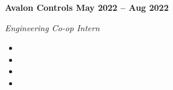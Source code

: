 \vspace{0.1cm}
\textbf{Avalon Controls \hfill May 2022 -- Aug 2022} \par
\textit{Engineering Co-op Intern} \par
\begin{itemize}
	\item
  \item 
  \item 
  \item 
\end{itemize} \par